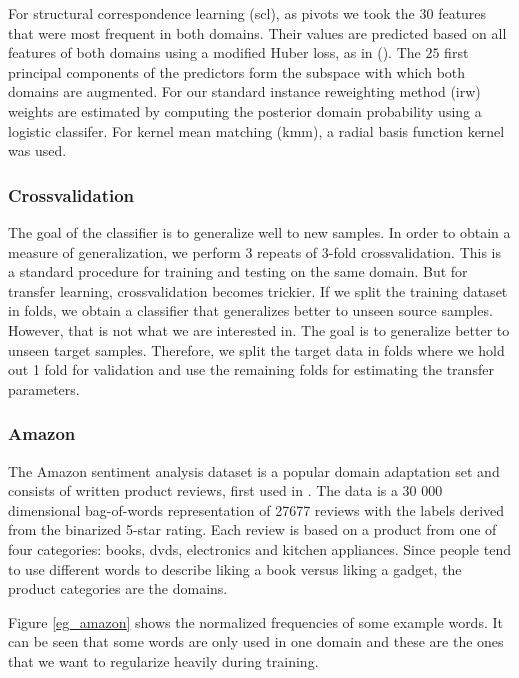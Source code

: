 \documentclass[twoside,11pt]{article}
\begin{document}
For structural correspondence learning ({\sc scl}), as pivots we took the 30 features that were most frequent in both domains. Their values are predicted based on all features of both domains using a modified Huber loss, as in (\citealp{ando2005framework}). The $25$ first principal components of the predictors form the subspace with which both domains are augmented. For our standard instance reweighting method ({\sc irw}) weights are estimated by computing the posterior domain probability using a logistic classifer. For kernel mean matching ({\sc kmm}), a radial basis function kernel was used. 

\subsubsection{Crossvalidation}
The goal of the classifier is to generalize well to new samples. In order to obtain a measure of generalization, we perform 3 repeats of 3-fold crossvalidation. This is a standard procedure for training and testing on the same domain. But for transfer learning, crossvalidation becomes trickier. If we split the training dataset in folds, we obtain a classifier that generalizes better to unseen source samples. However, that is not what we are interested in. The goal is to generalize better to unseen target samples. Therefore, we split the target data in folds where we hold out 1 fold for validation and use the remaining folds for estimating the transfer parameters. 

\subsubsection{Amazon}
The Amazon sentiment analysis dataset is a popular domain adaptation set and consists of written product reviews, first used in \cite{blitzer2007biographies}. The data is a 30 000 dimensional bag-of-words representation of 27677 reviews with the labels derived from the binarized 5-star rating. Each review is based on a product from one of four categories: books, dvds, electronics and kitchen appliances. Since people tend to use different words to describe liking a book versus liking a gadget, the product categories are the domains. 

Figure \ref{eg_amazon} shows the normalized frequencies of some example words. It can be seen that some words are only used in one domain and these are the ones that we want to regularize heavily during training.
\end{document}
